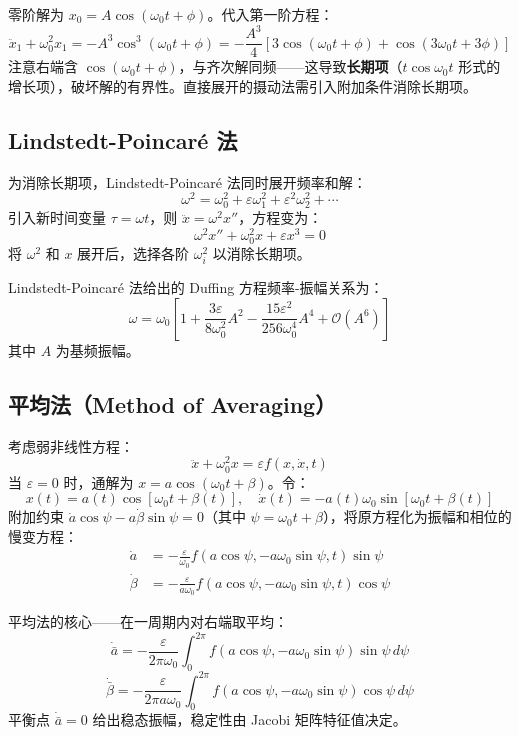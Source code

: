 零阶解为 $x_0 = A\cos(\omega_0 t + \phi)$。代入第一阶方程：
\[
\ddot{x}_1 + \omega_0^{2} x_1 = -A^{3}\cos^{3}(\omega_0 t + \phi) = -\frac{A^{3}}{4}\left[3\cos(\omega_0 t + \phi) + \cos(3\omega_0 t + 3\phi)\right]
\]
注意右端含 $\cos(\omega_0 t + \phi)$，与齐次解同频——这导致\textbf{长期项}（$t\cos\omega_0 t$ 形式的增长项），破坏解的有界性。直接展开的摄动法需引入附加条件消除长期项。

\subsection{Lindstedt-Poincar\'e 法}
为消除长期项，Lindstedt-Poincar\'e 法同时展开频率和解：
\[
\omega^{2} = \omega_0^{2} + \varepsilon\omega_1^{2} + \varepsilon^{2}\omega_2^{2} + \cdots
\]
引入新时间变量 $\tau = \omega t$，则 $\ddot{x} = \omega^{2} x''$，方程变为：
\[
\omega^{2} x'' + \omega_0^{2} x + \varepsilon x^{3} = 0
\]
将 $\omega^{2}$ 和 $x$ 展开后，选择各阶 $\omega_i^{2}$ 以消除长期项。

\begin{myformula}
Lindstedt-Poincar\'e 法给出的 Duffing 方程频率-振幅关系为：
\[
\omega = \omega_0\left[1 + \frac{3\varepsilon}{8\omega_0^{2}}A^{2} - \frac{15\varepsilon^{2}}{256\omega_0^{4}}A^{4} + \mathcal{O}(A^{6})\right]
\]
其中 $A$ 为基频振幅。
\end{myformula}

\subsection{平均法（Method of Averaging）}
考虑弱非线性方程：
\[
\ddot{x} + \omega_0^{2} x = \varepsilon f(x, \dot{x}, t)
\]
当 $\varepsilon = 0$ 时，通解为 $x = a\cos(\omega_0 t + \beta)$。令：
\[
x(t) = a(t)\cos[\omega_0 t + \beta(t)], \quad \dot{x}(t) = -a(t)\omega_0\sin[\omega_0 t + \beta(t)]
\]
附加约束 $\dot{a}\cos\psi - a\dot{\beta}\sin\psi = 0$（其中 $\psi = \omega_0 t + \beta$），将原方程化为振幅和相位的慢变方程：
\begin{align}
\dot{a} &= -\frac{\varepsilon}{\omega_0} f(a\cos\psi, -a\omega_0\sin\psi, t)\sin\psi \\
\dot{\beta} &= -\frac{\varepsilon}{a\omega_0} f(a\cos\psi, -a\omega_0\sin\psi, t)\cos\psi
\end{align}

\begin{myformula}
平均法的核心——在一周期内对右端取平均：
$$\dot{\bar{a}} = -\frac{\varepsilon}{2\pi\omega_0}\int_0^{2\pi} f(a\cos\psi, -a\omega_0\sin\psi)\sin\psi\,d\psi$$
$$\dot{\bar{\beta}} = -\frac{\varepsilon}{2\pi a \omega_0}\int_0^{2\pi} f(a\cos\psi, -a\omega_0\sin\psi)\cos\psi\,d\psi$$
平衡点 $\dot{\bar{a}} = 0$ 给出稳态振幅，稳定性由 Jacobi 矩阵特征值决定。
\end{myformula}

